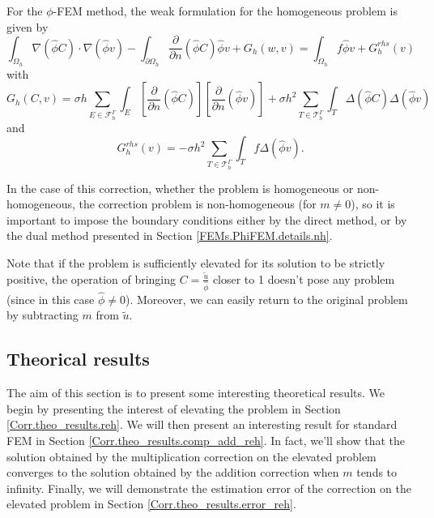 For the $\phi$-FEM method, the weak formulation for the homogeneous problem is given by
\begin{equation*}
	\int_{\Omega_h} \nabla (\hat{\phi} C) \cdot \nabla (\hat{\phi} v) - \int_{\partial\Omega_h} \frac{\partial}{\partial n}(\hat{\phi} C)\hat{\phi} v+G_h(w,v)=\int_{\Omega_h} f \hat{\phi} v + G_h^{rhs}(v)
\end{equation*}
with
\begin{equation*}
	G_h(C,v)=\sigma h\sum_{E\in\mathcal{F}_h^\Gamma} \int_E \left[\frac{\partial}{\partial n}(\hat{\phi} C)\right] \left[\frac{\partial}{\partial n}(\hat{\phi} v)\right]+\sigma h^2\sum_{T\in\mathcal{T}_h^\Gamma} \int_{T} \Delta(\hat{\phi} C)\Delta(\hat{\phi} v)
\end{equation*}
and
\begin{equation*}
	G_h^{rhs}(v)=-\sigma h^2\sum_{T\in\mathcal{T}_h^\Gamma} \int_{T} f \Delta(\hat{\phi} v).
\end{equation*}

In the case of this correction, whether the problem is homogeneous or non-homogeneous, the correction problem is non-homogeneous (for $m\ne 0$), so it is important to impose the boundary conditions either by the direct method, or by the dual method presented in Section \ref{FEMs.PhiFEM.details.nh}.

\begin{Rem}
	Note that if the problem is sufficiently elevated for its solution to be strictly positive, the operation of bringing $C=\frac{\tilde{u}}{\hat{\phi}}$ closer to 1 doesn't pose any problem (since in this case $\hat{\phi}\ne 0$). Moreover, we can easily return to the original problem by subtracting $m$ from $\tilde{u}$.
\end{Rem}

\subsection{Theorical results} \label{Corr.theo_results}

The aim of this section is to present some interesting theoretical results. We begin by presenting the interest of elevating the problem in Section \ref{Corr.theo_results.reh}. We will then present an interesting result for standard FEM in Section \ref{Corr.theo_results.comp_add_reh}. In fact, we'll show that the solution obtained by the multiplication correction on the elevated problem converges to the solution obtained by the addition correction when $m$ tends to infinity. Finally, we will demonstrate the estimation error of the correction on the elevated problem in Section \ref{Corr.theo_results.error_reh}.

